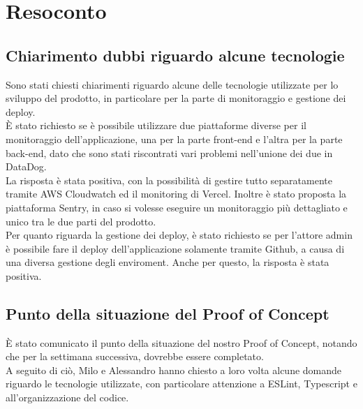 \section{Resoconto}
\subsection{Chiarimento dubbi riguardo alcune tecnologie}

Sono stati chiesti chiarimenti riguardo alcune delle tecnologie utilizzate per lo sviluppo del prodotto, in particolare per la parte di monitoraggio e gestione dei deploy.\\

È stato richiesto se è possibile utilizzare due piattaforme diverse per il monitoraggio dell'applicazione, una per la parte front-end e l'altra per la parte back-end, dato che sono stati riscontrati vari problemi nell'unione dei due in DataDog. \\
La risposta è stata positiva, con la possibilità di gestire tutto separatamente tramite AWS Cloudwatch ed il monitoring di Vercel. Inoltre è stato proposta la piattaforma Sentry, in caso si volesse eseguire un monitoraggio più dettagliato e unico tra le due parti del prodotto.\\

Per quanto riguarda la gestione dei deploy, è stato richiesto se per l'attore admin è possibile fare il deploy dell'applicazione solamente tramite Github, a causa di una diversa gestione degli enviroment. Anche per questo, la risposta è stata positiva.
  
\subsection{Punto della situazione del Proof of Concept}

È stato comunicato il punto della situazione del nostro Proof of Concept, notando che per la settimana successiva, dovrebbe essere completato. \\A seguito di ciò, Milo e Alessandro hanno chiesto a loro volta alcune domande riguardo le tecnologie utilizzate, con particolare attenzione a ESLint, Typescript e all'organizzazione del codice.
